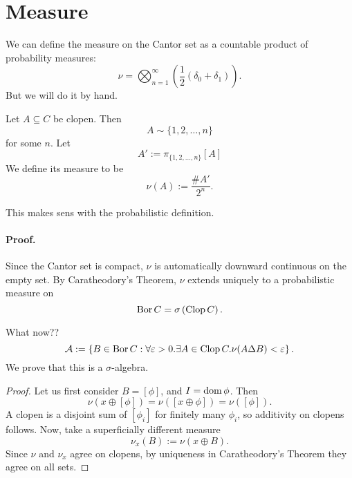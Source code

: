 \section{Measure}

We can define the measure on the Cantor set as a countable product of probability measures:
\[ 
    \nu = \bigotimes_{n=1}^\infty ( \frac{1}{2} (\delta_0 + \delta_1) ).
\]
But we will do it by hand.
\begin{defn}
Let \( A \subseteq C \) be clopen. Then
\[ 
    A \sim \{1, 2, \ldots, n\} 
\]
for some \( n \). Let
\[ 
    A' := \pi_{\{1, 2, \ldots, n\} }[A]
\]We define its measure to be
\[ 
    \nu (A) := \frac{\# A'}{2^n}.
\]
\end{defn}
This makes sens with the probabilistic definition.


\paragraph{Proof.} Since the Cantor set is compact, \( \nu \) is automatically downward continuous on the empty set. By Caratheodory's Theorem, \( \nu \) extends uniquely to a probabilistic measure on 
\[ 
    \operatorname{Bor} C = \sigma \left( \operatorname{Clop} C \right).
\]

What now??
\[ 
    \mathcal{A} := \left\{ B \in \operatorname{Bor} C : \forall\varepsilon > 0. \exists A \in \operatorname{Clop} C. \nu (A \Delta B) <\varepsilon \right\}.
\]
We prove that this is a \( \sigma \)-algebra.

\begin{proof}
    Let us first consider \( B = \left [ \phi \right ] \), and \( I = \operatorname{dom} \phi \). Then
    \[ 
       \nu \left( x \oplus \left[ \phi \right] \right) = \nu \left( \left[ x \oplus \phi \right] \right) = \nu \left( \left[ \phi \right] \right).
   \]
   A clopen is a disjoint sum of \( \left[ \phi_i \right] \) for finitely many \( \phi_i \), so additivity on clopens follows. Now, take a superficially different measure
   \[ 
      \nu_x(B) := \nu \left( x \oplus B \right). 
  \]
  Since \( \nu \) and \( \nu_x \) agree on clopens, by uniqueness in Caratheodory's Theorem they agree on all sets.
\end{proof}

